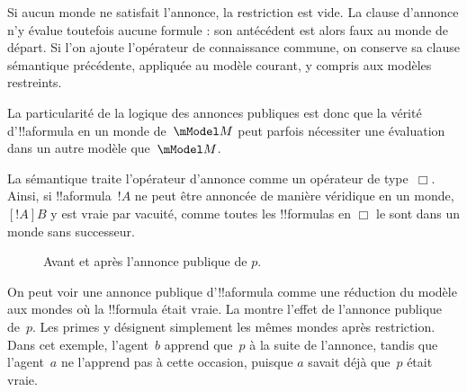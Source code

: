 \documentclass[../../../include/open-logic-section]{subfiles}
\begin{document}
Si aucun monde ne satisfait l'annonce, la restriction est vide.
La clause d'annonce n'y évalue toutefois aucune formule : son
antécédent est alors faux au monde de départ. Si l'on ajoute
l'opérateur de connaissance commune, on conserve sa clause
sémantique précédente, appliquée au modèle courant, y compris
aux modèles restreints.

La particularité de la logique des annonces publiques est donc que
la vérité d'!!a{formula} en un monde de~$\mModel M$ peut parfois
nécessiter une évaluation dans un autre modèle que~$\mModel M$.

La sémantique traite l'opérateur d'annonce comme un opérateur de
type~$\Box$. Ainsi, si !!a{formula}~$!A$ ne peut être annoncée
de manière véridique en un monde, $[!A]B$ y est vraie par vacuité,
comme toutes les !!{formula}s en $\Box$ le sont dans un monde
sans successeur.

\begin{figure}
  \begin{center}
  \end{center}
  \caption{Avant et après l'annonce publique de $p$.}
\end{figure}

On peut voir une annonce publique d'!!a{formula} comme une
réduction du modèle aux mondes où la !!{formula} était vraie.
La  montre l'effet de l'annonce
publique de~$p$. Les primes y désignent simplement les mêmes mondes
après restriction. Dans cet exemple, l'agent~$b$ apprend que~$p$
à la suite de l'annonce, tandis que l'agent~$a$ ne l'apprend pas à
cette occasion, puisque $a$ savait déjà que~$p$ était vraie.
\end{document}

